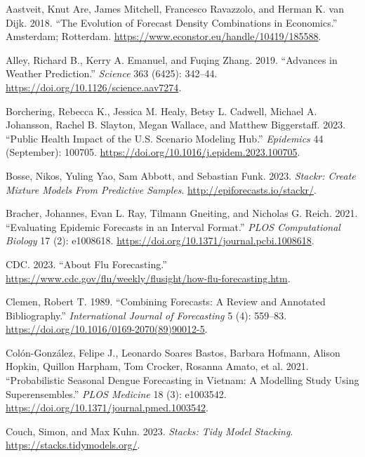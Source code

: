 \documentclass[
]{article}
\newlength{\cslhangindent}
\newenvironment{CSLReferences}[2] %
 {\begin{list}{}{%
  \setlength{\itemindent}{0pt}
  \setlength{\leftmargin}{0pt}
  \setlength{\parsep}{0pt}
  \ifodd #1
   \setlength{\leftmargin}{\cslhangindent}
   \setlength{\itemindent}{-1\cslhangindent}
  \fi
  \setlength{\itemsep}{#2\baselineskip}}}
 {\end{list}}
\begin{document}
\label{refs}
\begin{CSLReferences}{1}{0}
Aastveit, Knut Are, James Mitchell, Francesco Ravazzolo, and Herman K.
van Dijk. 2018. {``The Evolution of Forecast Density Combinations in
Economics.''} Amsterdam; Rotterdam.
\url{https://www.econstor.eu/handle/10419/185588}.

Alley, Richard B., Kerry A. Emanuel, and Fuqing Zhang. 2019. {``Advances
in Weather Prediction.''} \emph{Science} 363 (6425): 342--44.
\url{https://doi.org/10.1126/science.aav7274}.

Borchering, Rebecca K., Jessica M. Healy, Betsy L. Cadwell, Michael A.
Johansson, Rachel B. Slayton, Megan Wallace, and Matthew Biggerstaff.
2023. {``Public Health Impact of the {U}.{S}. {Scenario} {Modeling}
{Hub}.''} \emph{Epidemics} 44 (September): 100705.
\url{https://doi.org/10.1016/j.epidem.2023.100705}.

Bosse, Nikos, Yuling Yao, Sam Abbott, and Sebastian Funk. 2023.
\emph{Stackr: {Create} {Mixture} {Models} {From} {Predictive}
{Samples}}. \url{http://epiforecasts.io/stackr/}.

Bracher, Johannes, Evan L. Ray, Tilmann Gneiting, and Nicholas G. Reich.
2021. {``Evaluating Epidemic Forecasts in an Interval Format.''}
\emph{PLOS Computational Biology} 17 (2): e1008618.
\url{https://doi.org/10.1371/journal.pcbi.1008618}.

CDC. 2023. {``About Flu Forecasting.''}
\url{https://www.cdc.gov/flu/weekly/flusight/how-flu-forecasting.htm}.

Clemen, Robert T. 1989. {``Combining Forecasts: A Review and Annotated
Bibliography.''} \emph{International Journal of Forecasting} 5 (4):
559--83. \url{https://doi.org/10.1016/0169-2070(89)90012-5}.

Colón-González, Felipe J., Leonardo Soares Bastos, Barbara Hofmann,
Alison Hopkin, Quillon Harpham, Tom Crocker, Rosanna Amato, et al. 2021.
{``Probabilistic Seasonal Dengue Forecasting in {Vietnam}: {A} Modelling
Study Using Superensembles.''} \emph{PLOS Medicine} 18 (3): e1003542.
\url{https://doi.org/10.1371/journal.pmed.1003542}.

Couch, Simon, and Max Kuhn. 2023. \emph{Stacks: Tidy Model Stacking}.
\url{https://stacks.tidymodels.org/}.


\end{CSLReferences}
\end{document}
